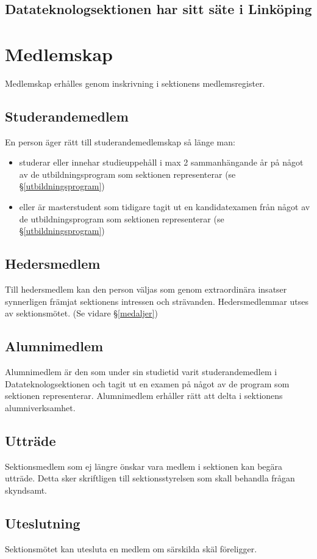 \documentclass{datateknologsektionen-document}
\begin{document}
    \subsection{Datateknologsektionen har sitt säte i Linköping}
  \section{Medlemskap}
    \label{medlemskap}
    Medlemskap erhålles genom inskrivning i sektionens medlemsregister.
    \subsection{Studerandemedlem}
      En person äger rätt till studerandemedlemskap så länge man:
      \begin{itemize}
        \item studerar eller innehar studieuppehåll i max 2 sammanhängande år på något av de
        utbildningsprogram som sektionen representerar (se \S \ref{utbildningsprogram})
        \item eller är masterstudent som tidigare tagit ut en kandidatexamen från något av de
        utbildningsprogram som sektionen representerar (se \S \ref{utbildningsprogram})
      \end{itemize}
    \subsection{Hedersmedlem}
      Till hedersmedlem kan den person väljas som genom extraordinära insatser synnerligen
      främjat sektionens intressen och strävanden. Hedersmedlemmar utses av
      sektionsmötet. (Se vidare \S \ref{medaljer})

    \subsection{Alumnimedlem}
      Alumnimedlem är den som under sin studietid varit studerandemedlem i
      Datateknologsektionen och tagit ut en examen på något av de program som sektionen
      representerar. Alumnimedlem erhåller rätt att delta i sektionens alumniverksamhet.
    \subsection{Utträde}
      Sektionsmedlem som ej längre önskar vara medlem i sektionen kan begära utträde.
      Detta sker skriftligen till sektionsstyrelsen som skall behandla frågan skyndsamt.
    \subsection{Uteslutning}
      Sektionsmötet kan utesluta en medlem om särskilda skäl föreligger.
\end{document}
